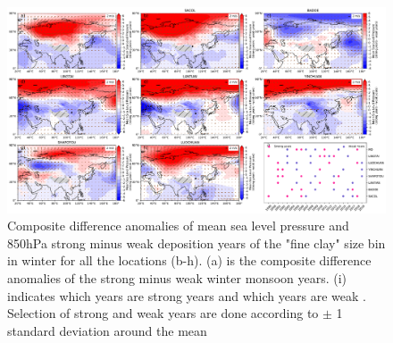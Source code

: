 \begin{figure}
    \centering
    \includegraphics[width=\columnwidth]{texfiles/figs/mslp_850hPa_2micron_DJF.pdf}
    \caption{Composite difference anomalies of mean sea level pressure and 850hPa strong minus weak deposition years of the "fine clay" size bin in winter for all the locations (b-h). (a) is the composite difference anomalies of the strong minus weak winter monsoon years. (i) indicates which years are strong years and which years are weak . Selection of strong and weak years are done according to $\pm$ 1 standard deviation around the mean}
    \label{fig:DJF_850_fine_composite}
\end{figure}